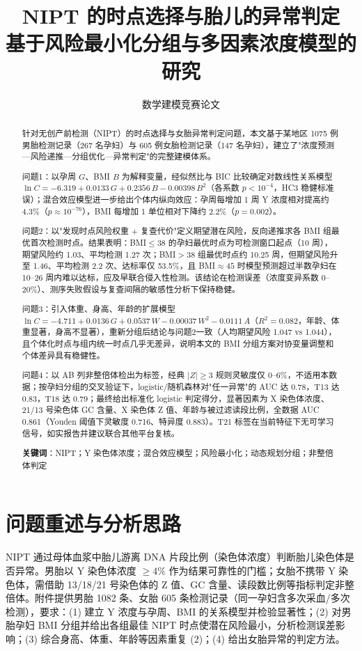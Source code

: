 \documentclass[UTF8,a4paper,11pt]{ctexart}
\title{\textbf{NIPT 的时点选择与胎儿的异常判定}\\[2mm]
\large 基于风险最小化分组与多因素浓度模型的研究}
\author{数学建模竞赛论文}
\date{}
\begin{document}
\maketitle

\begin{abstract}
针对无创产前检测（NIPT）的时点选择与女胎异常判定问题，本文基于某地区 1075 例男胎检测记录（267 名孕妇）与 605 例女胎检测记录（147 名孕妇），建立了"浓度预测—风险递推—分组优化—异常判定"的完整建模体系。

问题1：以孕周 $G$、BMI $B$ 为解释变量，经似然比与 BIC 比较确定对数线性关系模型 $\ln C=-6.319+0.0133\,G+0.2356\,B-0.00398\,B^{2}$（各系数 $p<10^{-4}$，HC3 稳健标准误）；混合效应模型进一步给出个体内纵向效应：孕周每增加 1 周 Y 浓度相对提高约 4.3\%（$p\approx10^{-76}$），BMI 每增加 1 单位相对下降约 2.2\%（$p=0.002$）。

问题2：以"发现时点风险权重 + 复查代价"定义期望潜在风险，反向递推求各 BMI 组最优首次检测时点。结果表明：BMI$\le 38$ 的孕妇最优时点为可检测窗口起点（10 周），期望风险约 1.03、平均检测 1.27 次；BMI$>38$ 组最优时点约 10.25 周，但期望风险升至 1.46、平均检测 2.2 次、达标率仅 53.5\%，且 BMI$\approx45$ 时模型预测超过半数孕妇在 10--26 周内难以达标，应及早联合侵入性检测。该结论在检测误差（浓度变异系数 0--20\%）、测序失败假设与复查间隔的敏感性分析下保持稳健。

问题3：引入体重、身高、年龄的扩展模型 $\ln C=-4.711+0.0136\,G+0.0537\,W-0.00037\,W^{2}-0.0111\,A$（$R^{2}=0.082$，年龄、体重显著，身高不显著），重新分组后结论与问题2一致（人均期望风险 1.047 vs 1.044），且个体化时点与组内统一时点几乎无差异，说明本文的 BMI 分组方案对协变量调整和个体差异具有稳健性。

问题4：以 AB 列非整倍体检出为标签，经典 $|Z|\ge3$ 规则灵敏度仅 0--6\%，不适用本数据；按孕妇分组的交叉验证下，logistic/随机森林对"任一异常"的 AUC 达 0.78，T13 达 0.83，T18 达 0.79；最终给出标准化 logistic 判定得分，显著因素为 X 染色体浓度、21/13 号染色体 GC 含量、X 染色体 Z 值、年龄与被过滤读段比例，全数据 AUC 0.861（Youden 阈值下灵敏度 0.716、特异度 0.883）。T21 标签在当前特征下无可学习信号，如实报告并建议联合其他平台复核。

\textbf{关键词}：NIPT；Y 染色体浓度；混合效应模型；风险最小化；动态规划分组；非整倍体判定
\end{abstract}

\section{问题重述与分析思路}
NIPT 通过母体血浆中胎儿游离 DNA 片段比例（染色体浓度）判断胎儿染色体是否异常。男胎以 Y 染色体浓度 $\ge4\%$ 作为结果可靠性的门槛；女胎不携带 Y 染色体，需借助 13/18/21 号染色体的 Z 值、GC 含量、读段数比例等指标判定非整倍体。附件提供男胎 1082 条、女胎 605 条检测记录（同一孕妇含多次采血/多次检测），要求：(1) 建立 Y 浓度与孕周、BMI 的关系模型并检验显著性；(2) 对男胎孕妇 BMI 分组并给出各组最佳 NIPT 时点使潜在风险最小，分析检测误差影响；(3) 综合身高、体重、年龄等因素重复 (2)；(4) 给出女胎异常的判定方法。
\end{document}
